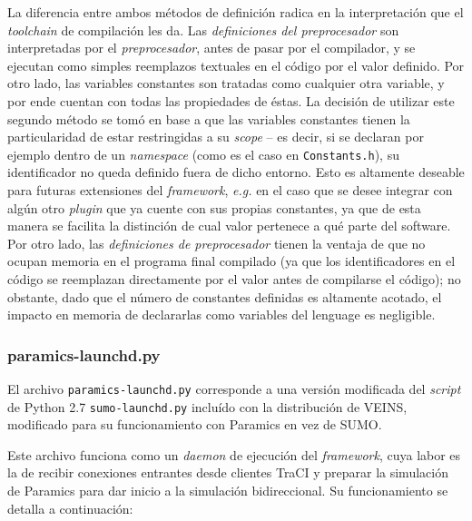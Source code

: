 La diferencia entre ambos métodos de definición radica en la interpretación que el \emph{toolchain} de compilación les da. Las \emph{definiciones del preprocesador} son interpretadas por el \emph{preprocesador}, antes de pasar por el compilador, y se ejecutan como simples reemplazos textuales en el código por el valor definido. Por otro lado, las variables constantes son tratadas como cualquier otra variable, y por ende cuentan con todas las propiedades de éstas. La decisión de utilizar este segundo método se tomó en base a que las variables constantes tienen la particularidad de estar restringidas a su \emph{scope} -- es decir, si se declaran por ejemplo dentro de un \emph{namespace} (como es el caso en \texttt{Constants.h}), su identificador no queda definido fuera de dicho entorno.
Esto es altamente deseable para futuras extensiones del \emph{framework}, \emph{e.g.} en el caso que se desee integrar con algún otro \emph{plugin} que ya cuente con sus propias constantes, ya que de esta manera se facilita la distinción de cual valor pertenece a qué parte del software. Por otro lado, las \emph{definiciones de preprocesador} tienen la ventaja de que no ocupan memoria en el programa final compilado (ya que los identificadores en el código se reemplazan directamente por el valor antes de compilarse el código); no obstante, dado que el número de constantes definidas es altamente acotado, el impacto en memoria de declararlas como variables del lenguage es negligible.

\subsubsection{paramics-launchd.py}

El archivo \texttt{paramics-launchd.py} corresponde a una versión modificada del \emph{script} de Python 2.7 \texttt{sumo-launchd.py} incluído con la distribución de VEINS, modificado para su funcionamiento con Paramics en vez de SUMO.

Este archivo funciona como un \emph{daemon} de ejecución del \emph{framework}, cuya labor es la de recibir conexiones entrantes desde clientes TraCI y preparar la simulación de Paramics para dar inicio a la simulación bidireccional. Su funcionamiento se detalla a continuación:

